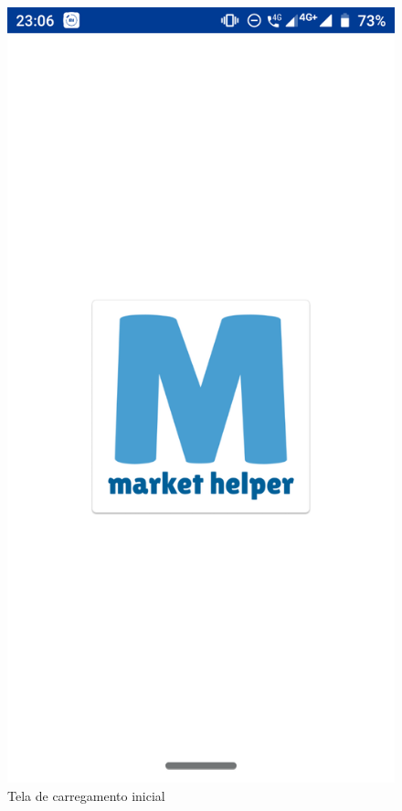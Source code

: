 \begin{figure}[h]
    \centering
    \includegraphics[scale=0.15]{tcc/figures/app/app_loading.png}
    \caption{Tela de carregamento inicial}
    \label{appLoadingFig}
\end{figure}

